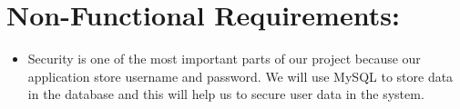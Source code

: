 \section{Non-Functional Requirements:}
    \begin{itemize}
        \item Security is one of the most important parts of our project because our application store username and password. We will use MySQL to store data in the database and this will help us to secure user data in the system.
    \end{itemize}
